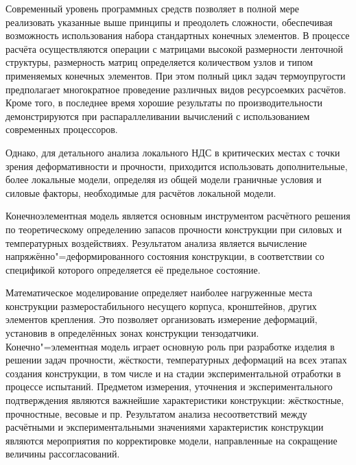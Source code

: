 Современный уровень программных средств позволяет в полной мере реализовать указанные выше принципы и преодолеть сложности, обеспечивая возможность использования набора стандартных конечных элементов. В процессе расчёта осуществляются операции с матрицами высокой размерности ленточной структуры, размерность матриц определяется количеством узлов и типом применяемых конечных элементов. При этом полный цикл задач термоупругости предполагает многократное проведение различных видов ресурсоемких расчётов. Кроме того, в последнее время хорошие результаты по производительности демонстрируются при распараллеливании вычислений с использованием современных процессоров.



Однако, для детального анализа локального НДС в критических местах с точки зрения деформативности и прочности, приходится использовать дополнительные, более локальные модели, определяя из общей модели граничные условия и силовые факторы, необходимые для расчётов локальной модели.



Конечноэлементная модель является основным инструментом расчётного решения по теоретическому определению запасов прочности конструкции при силовых и температурных воздействиях. Результатом анализа является вычисление напряжённо"=деформированного состояния конструкции, в соответствии со спецификой которого определяется её предельное состояние.



Математическое моделирование определяет наиболее нагруженные места конструкции размеростабильного несущего корпуса, кронштейнов, других элементов крепления. Это позволяет организовать измерение деформаций, установив в определённых зонах конструкции тензодатчики. Конечно"=элементная модель играет основную роль при разработке изделия в решении задач прочности, жёсткости, температурных деформаций на всех этапах создания конструкции, в том числе и на стадии экспериментальной отработки в процессе испытаний. Предметом измерения, уточнения и экспериментального подтверждения являются важнейшие характеристики конструкции: жёсткостные, прочностные, весовые и пр. Результатом анализа несоответствий между расчётными и экспериментальными значениями характеристик конструкции являются мероприятия по корректировке модели, направленные на сокращение величины рассогласований.



